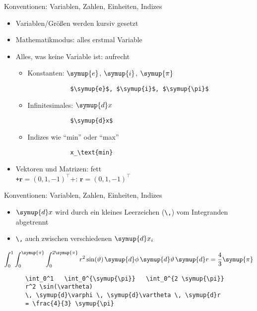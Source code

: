 \begin{frame}[fragile]{Konventionen: Variablen, Zahlen, Einheiten, Indizes}
  \begin{itemize}
    \item Variablen/Größen werden kursiv gesetzt
    \item Mathematikmodus: alles erstmal Variable
    \item Alles, was keine Variable ist: aufrecht
      \begin{itemize}
        \item Konstanten: $\symup{e}$, $\symup{i}$, $\symup{\pi}$
          \smallskip
          \begin{verbatim}
            $\symup{e}$, $\symup{i}$, $\symup{\pi}$
          \end{verbatim}
          \medskip
        \item Infinitesimales: $\symup{d}x$
          \smallskip
          \begin{verbatim}
            $\symup{d}x$
          \end{verbatim}
          \medskip
        \item Indizes wie \enquote{min} oder \enquote{max}
          \smallskip
          \begin{verbatim}
            x_\text{min}
          \end{verbatim}
      \end{itemize}
    \item Vektoren und Matrizen: fett\\
      \texttt+$\symbf{r} = (0, 1, -1)^\top$+:\; $\symbf{r} = (0, 1, -1)^\top$

  \end{itemize}
\end{frame}

\begin{frame}[fragile]{Konventionen: Variablen, Zahlen, Einheiten, Indizes}
  \begin{itemize}
    \item $\symup{d}x$ wird durch ein kleines Leerzeichen (\verb+\,+) vom Integranden abgetrennt
    \item \verb+\,+ auch zwischen verschiedenen $\symup{d}x_i$
  \end{itemize}

  \begin{equation*}
    \int_0^1 \int_0^{\symup{\pi}} \int_0^{2 \symup{\pi}}
    r^2 \sin(\vartheta) \,
    \symup{d}\phi \, \symup{d}\vartheta \, \symup{d}r
    = \frac{4}{3} \symup{\pi}
  \end{equation*}

  \vspace{1em}
  \qquad
  \begin{minipage}{0.8\textwidth}
    \begin{verbatim}
      \int_0^1   \int_0^{\symup{\pi}}   \int_0^{2 \symup{\pi}}
      r^2 \sin(\vartheta)
      \, \symup{d}\varphi \, \symup{d}\vartheta \, \symup{d}r
      = \frac{4}{3} \symup{\pi}
    \end{verbatim}
  \end{minipage}
\end{frame}
